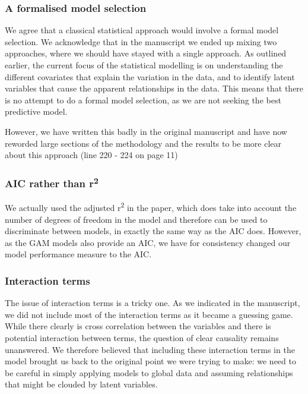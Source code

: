\documentclass[]{elsarticle} %
\begin{document}
\hypertarget{a-formalised-model-selection}{%
\subsubsection{A formalised model selection}\label{a-formalised-model-selection}}

We agree that a classical statistical approach would involve a formal model selection. We acknowledge that in the manuscript we ended up mixing two approaches, where we should have stayed with a single approach. As outlined earlier, the current focus of the statistical modelling is on understanding the different covariates that explain the variation in the data, and to identify latent variables that cause the apparent relationships in the data. This means that there is no attempt to do a formal model selection, as we are not seeking the best predictive model.

However, we have written this badly in the original manuscript and have now reworded large sections of the methodology and the results to be more clear about this approach (line 220 - 224 on page 11)

\hypertarget{aic-rather-than-r2}{%
\subsubsection{\texorpdfstring{AIC rather than r\textsuperscript{2}}{AIC rather than r2}}\label{aic-rather-than-r2}}

We actually used the adjusted r\textsuperscript{2} in the paper, which does take into account the number of degrees of freedom in the model and therefore can be used to discriminate between models, in exactly the same way as the AIC does. However, as the GAM models also provide an AIC, we have for consistency changed our model performance measure to the AIC.

\hypertarget{interaction-terms}{%
\subsubsection{Interaction terms}\label{interaction-terms}}

The issue of interaction terms is a tricky one. As we indicated in the manuscript, we did not include most of the interaction terms as it became a guessing game. While there clearly is cross correlation between the variables and there is potential interaction between terms, the question of clear causality remains unanswered. We therefore believed that including these interaction terms in the model brought us back to the original point we were trying to make: we need to be careful in simply applying models to global data and assuming relationships that might be clouded by latent variables.
\end{document}
